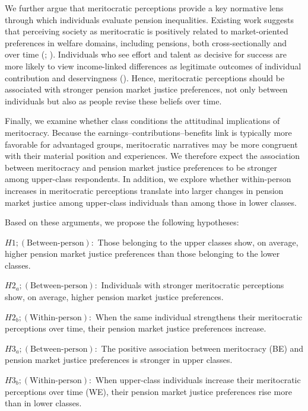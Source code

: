 \documentclass[
  12pt,
]{article}
\begin{document}
We further argue that meritocratic perceptions provide a key normative
lens through which individuals evaluate pension inequalities. Existing
work suggests that perceiving society as meritocratic is positively
related to market-oriented preferences in welfare domains, including
pensions, both cross-sectionally and over time
(;
).
Individuals who see effort and talent as decisive for success are more
likely to view income-linked differences as legitimate outcomes of
individual contribution and deservingness
().
Hence, meritocratic perceptions should be associated with stronger
pension market justice preferences, not only between individuals but
also as people revise these beliefs over time.

Finally, we examine whether class conditions the attitudinal
implications of meritocracy. Because the
earnings--contributions--benefits link is typically more favorable for
advantaged groups, meritocratic narratives may be more congruent with
their material position and experiences. We therefore expect the
association between meritocracy and pension market justice preferences
to be stronger among upper-class respondents. In addition, we explore
whether within-person increases in meritocratic perceptions translate
into larger changes in pension market justice among upper-class
individuals than among those in lower classes.

Based on these arguments, we propose the following hypotheses:

\(H1 ; (\text{Between-person}):\) Those belonging to the upper classes
show, on average, higher pension market justice preferences than those
belonging to the lower classes.

\(H2_{a} ; (\text{Between-person}):\) Individuals with stronger
meritocratic perceptions show, on average, higher pension market justice
preferences.

\(H2_{b} ; (\text{Within-person}):\) When the same individual
strengthens their meritocratic perceptions over time, their pension
market justice preferences increase.

\(H3_{a} ; (\text{Between-person}):\) The positive association between
meritocracy (BE) and pension market justice preferences is stronger in
upper classes.

\(H3_{b} ; (\text{Within-person}):\) When upper-class individuals
increase their meritocratic perceptions over time (WE), their pension
market justice preferences rise more than in lower classes.
\end{document}
